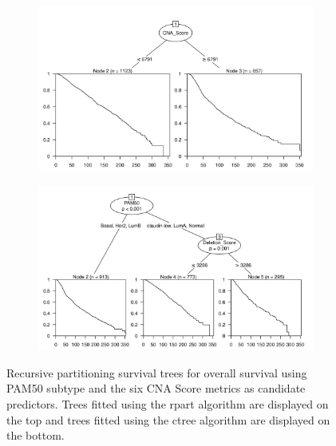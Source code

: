 \begin{figure}[!htb]
\centering

\vspace{0.5cm}

\begin{subfigure}{\textwidth}
\subcaption{}
\includegraphics[width=1\textwidth]{../figures/Appendices/Appendix_B/PartyKit_Survival_Score_OS_PAM50.png}
\end{subfigure}

\vspace{2cm}

\begin{subfigure}{\textwidth}
\subcaption{}
\includegraphics[width=1\textwidth]{../figures/Appendices/Appendix_B/Ctree_Survival_Score_OS_PAM50.png}
\end{subfigure}

\vspace{0.5cm}

\caption[Recursive partitioning survival trees for overall survival using PAM50 subtype and the six CNA Score metrics as candidate predictors.]{Recursive partitioning survival trees for overall survival using PAM50 subtype and the six CNA Score metrics as candidate predictors. Trees fitted using the rpart algorithm are displayed on the top and trees fitted using the ctree algorithm are displayed on the bottom.}
\end{figure}

